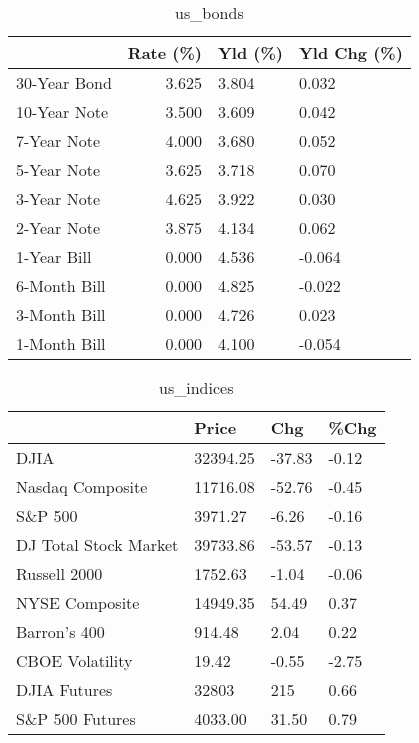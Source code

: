 \documentclass{article}%
\begin{document}
%


\begin{table}[htbp]%
\caption{us\_bonds}%
\centering%
\begin{adjustbox}{width=1\textwidth}%
\begin{tabular}{lrll}
\toprule
             &  Rate (\%) & Yld (\%) & Yld Chg (\%) \\
\midrule
30-Year Bond &     3.625 &   3.804 &       0.032 \\
10-Year Note &     3.500 &   3.609 &       0.042 \\
 7-Year Note &     4.000 &   3.680 &       0.052 \\
 5-Year Note &     3.625 &   3.718 &       0.070 \\
 3-Year Note &     4.625 &   3.922 &       0.030 \\
 2-Year Note &     3.875 &   4.134 &       0.062 \\
 1-Year Bill &     0.000 &   4.536 &      -0.064 \\
6-Month Bill &     0.000 &   4.825 &      -0.022 \\
3-Month Bill &     0.000 &   4.726 &       0.023 \\
1-Month Bill &     0.000 &   4.100 &      -0.054 \\
\bottomrule
\end{tabular}
%
\end{adjustbox}%
\end{table}

%


\begin{table}[htbp]%
\caption{us\_indices}%
\centering%
\begin{adjustbox}{width=1\textwidth}%
\begin{tabular}{llll}
\toprule
                      &    Price &    Chg &  \%Chg \\
\midrule
                 DJIA & 32394.25 & -37.83 & -0.12 \\
     Nasdaq Composite & 11716.08 & -52.76 & -0.45 \\
              S\&P 500 &  3971.27 &  -6.26 & -0.16 \\
DJ Total Stock Market & 39733.86 & -53.57 & -0.13 \\
         Russell 2000 &  1752.63 &  -1.04 & -0.06 \\
       NYSE Composite & 14949.35 &  54.49 &  0.37 \\
         Barron's 400 &   914.48 &   2.04 &  0.22 \\
      CBOE Volatility &    19.42 &  -0.55 & -2.75 \\
         DJIA Futures &    32803 &    215 &  0.66 \\
      S\&P 500 Futures &  4033.00 &  31.50 &  0.79 \\
\bottomrule
\end{tabular}
%
\end{adjustbox}%
\end{table}
\end{document}
